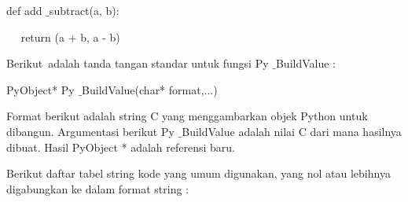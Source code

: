 \documentclass[a4paper,12pt]{report}
\begin{document}
\noindent 
def add $  \_  $subtract(a, b): \par
\noindent 
~~ return (a + b, a - b) \par
\vspace{14pt}
Berikut~adalah tanda tangan standar untuk fungsi Py $  \_  $BuildValue  : \par
\noindent 
PyObject* Py $  \_  $BuildValue(char* format,...) \par
\vspace{14pt}
Format berikut adalah string C yang menggambarkan objek Python untuk dibangun. Argumentasi berikut Py $  \_  $BuildValue adalah nilai C dari mana hasilnya dibuat. Hasil PyObject * adalah referensi baru.  \par
Berikut daftar tabel string kode yang umum digunakan, yang nol atau lebihnya digabungkan ke dalam format string : \par


\end{document}
